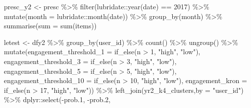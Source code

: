 \documentclass[
]{article}
\newenvironment{Shaded}{\begin{snugshade}}{\end{snugshade}}
\newcommand{\AttributeTok}[1]{\textcolor[rgb]{0.77,0.63,0.00}{#1}}
\newcommand{\DecValTok}[1]{\textcolor[rgb]{0.00,0.00,0.81}{#1}}
\newcommand{\FloatTok}[1]{\textcolor[rgb]{0.00,0.00,0.81}{#1}}
\newcommand{\FunctionTok}[1]{\textcolor[rgb]{0.00,0.00,0.00}{#1}}
\newcommand{\NormalTok}[1]{#1}
\newcommand{\OtherTok}[1]{\textcolor[rgb]{0.56,0.35,0.01}{#1}}
\newcommand{\SpecialCharTok}[1]{\textcolor[rgb]{0.00,0.00,0.00}{#1}}
\newcommand{\StringTok}[1]{\textcolor[rgb]{0.31,0.60,0.02}{#1}}
\begin{document}
\begin{Shaded}
\begin{Highlighting}[]
\NormalTok{ presc\_y2 }\OtherTok{\textless{}{-}}\NormalTok{ presc }\SpecialCharTok{\%\textgreater{}\%} 
   \FunctionTok{filter}\NormalTok{(lubridate}\SpecialCharTok{::}\FunctionTok{year}\NormalTok{(date) }\SpecialCharTok{==} \DecValTok{2017}\NormalTok{) }\SpecialCharTok{\%\textgreater{}\%}
   \FunctionTok{mutate}\NormalTok{(}\AttributeTok{month =}\NormalTok{ lubridate}\SpecialCharTok{::}\FunctionTok{month}\NormalTok{(date)) }\SpecialCharTok{\%\textgreater{}\%} 
   \FunctionTok{group\_by}\NormalTok{(month) }\SpecialCharTok{\%\textgreater{}\%} 
   \FunctionTok{summarise}\NormalTok{(}\AttributeTok{sum =} \FunctionTok{sum}\NormalTok{(items))}


\NormalTok{ letest }\OtherTok{\textless{}{-}}\NormalTok{  dfy2 }\SpecialCharTok{\%\textgreater{}\%}
   \FunctionTok{group\_by}\NormalTok{(user\_id) }\SpecialCharTok{\%\textgreater{}\%}
   \FunctionTok{count}\NormalTok{() }\SpecialCharTok{\%\textgreater{}\%}
   \FunctionTok{ungroup}\NormalTok{() }\SpecialCharTok{\%\textgreater{}\%} 
   \FunctionTok{mutate}\NormalTok{(}\AttributeTok{engagement\_threshold\_1 =} \FunctionTok{if\_else}\NormalTok{(n }\SpecialCharTok{\textgreater{}} \DecValTok{1}\NormalTok{, }\StringTok{"high"}\NormalTok{, }\StringTok{"low"}\NormalTok{),}
          \AttributeTok{engagement\_threshold\_3 =} \FunctionTok{if\_else}\NormalTok{(n }\SpecialCharTok{\textgreater{}} \DecValTok{3}\NormalTok{, }\StringTok{"high"}\NormalTok{, }\StringTok{"low"}\NormalTok{),}
          \AttributeTok{engagement\_threshold\_5 =} \FunctionTok{if\_else}\NormalTok{(n }\SpecialCharTok{\textgreater{}} \DecValTok{5}\NormalTok{, }\StringTok{"high"}\NormalTok{, }\StringTok{"low"}\NormalTok{),}
          \AttributeTok{engagement\_threshold\_10 =} \FunctionTok{if\_else}\NormalTok{(n }\SpecialCharTok{\textgreater{}} \DecValTok{10}\NormalTok{, }\StringTok{"high"}\NormalTok{, }\StringTok{"low"}\NormalTok{),}
          \AttributeTok{engagement\_kron =} \FunctionTok{if\_else}\NormalTok{(n }\SpecialCharTok{\textgreater{}} \DecValTok{17}\NormalTok{, }\StringTok{"high"}\NormalTok{, }\StringTok{"low"}\NormalTok{)) }\SpecialCharTok{\%\textgreater{}\%} 
   \FunctionTok{left\_join}\NormalTok{(yr2\_k4\_clusters,}\AttributeTok{by =} \StringTok{"user\_id"}\NormalTok{) }\SpecialCharTok{\%\textgreater{}\%} 
\NormalTok{   dplyr}\SpecialCharTok{::}\FunctionTok{select}\NormalTok{(}\SpecialCharTok{{-}}\NormalTok{prob}\FloatTok{.1}\NormalTok{,}
                 \SpecialCharTok{{-}}\NormalTok{prob}\FloatTok{.2}\NormalTok{,}

\end{Highlighting}
\end{Shaded}
\end{document}
